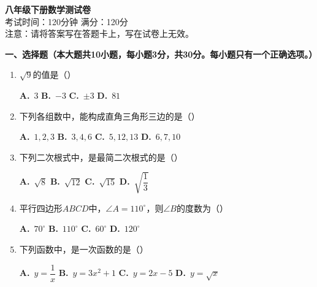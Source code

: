 \documentclass[12pt, a4paper]{ctexart}
\begin{document}
\begin{center}
    {\LARGE\bfseries 八年级下册数学测试卷}\\[0.5cm]
    {\large 考试时间：120分钟 \quad 满分：120分}\\[0.3cm]
    {\normalsize 注意：请将答案写在答题卡上，写在试卷上无效。}
\end{center}

\vspace{0.5cm}

{\large\bfseries 一、选择题（本大题共10小题，每小题3分，共30分。每小题只有一个正确选项。）}

\begin{enumerate}[label=\arabic*.]

\item $\sqrt{9}$的值是（\hspace{1cm}）
\begin{enumerate}[label=\Alph*.]
\quad \textbf{A.}~$3$ \quad \textbf{B.}~$-3$ \quad \textbf{C.}~$\pm 3$ \quad \textbf{D.}~$81$
\end{enumerate}

\item 下列各组数中，能构成直角三角形三边的是（\hspace{1cm}）
\begin{enumerate}[label=\Alph*.]
\quad \textbf{A.}~$1,2,3$ \quad \textbf{B.}~$3,4,6$ \quad \textbf{C.}~$5,12,13$ \quad \textbf{D.}~$6,7,10$
\end{enumerate}

\item 下列二次根式中，是最简二次根式的是（\hspace{1cm}）
\begin{enumerate}[label=\Alph*.]
\quad \textbf{A.}~$\sqrt{8}$ \quad \textbf{B.}~$\sqrt{12}$ \quad \textbf{C.}~$\sqrt{15}$ \quad \textbf{D.}~$\sqrt{\dfrac{1}{3}}$
\end{enumerate}

\item 平行四边形$ABCD$中，$\angle A=110^{\circ}$，则$\angle B$的度数为（\hspace{1cm}）
\begin{enumerate}[label=\Alph*.]
\quad \textbf{A.}~$70^{\circ}$ \quad \textbf{B.}~$110^{\circ}$ \quad \textbf{C.}~$60^{\circ}$ \quad \textbf{D.}~$120^{\circ}$
\end{enumerate}

\item 下列函数中，是一次函数的是（\hspace{1cm}）
\begin{enumerate}[label=\Alph*.]
\quad \textbf{A.}~$y=\dfrac{1}{x}$ \quad \textbf{B.}~$y=3x^{2}+1$ \quad \textbf{C.}~$y=2x-5$ \quad \textbf{D.}~$y=\sqrt{x}$
\end{enumerate}


\end{enumerate}
\end{document}
